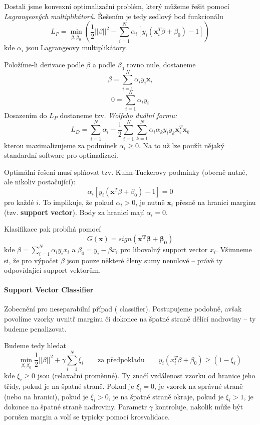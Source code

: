 \documentclass[11pt]{report} %
\renewcommand{\vec}[1]{\mathbf{#1}}
\numberwithin{equation}{section}
\begin{document}
Dostali jsme konvexní optimalizační problém, který můžeme řešit pomocí \textit{Lagrangeových multiplikátorů}. Řešením je tedy sedlový bod funkcionálu
$$L_P = \min_{\beta,\beta_0}\left(\frac{1}{2}||\beta||^2 - \sum_{i=1}^{N} \alpha_i [y_i(\vec{x}_i^T\beta + \beta_0)-1]\right)$$ 
kde $\alpha_i$ jsou Lagrangeovy multiplikátory.

Položíme-li derivace podle $\beta$ a podle $\beta_0$ rovno nule, dostaneme
$$\beta = \sum_{i=1}^{N} \alpha_i y_i \vec{x}_i$$
$$0 = \sum_{i=1}^{N} \alpha_i y_i$$
Dosazením do $L_P$ dostaneme tzv. \textit{Wolfeho duální formu:}
$$L_D = \sum_{i=1}^{N}\alpha_i - \frac{1}{2}\sum_{i=1}^{N}\sum_{k=1}^{N}\alpha_i \alpha_k y_i y_k \vec{x}_i^T \vec{x}_k$$
kterou maximalizujeme za podmínek $\alpha_i \geq0$. Na to už lze použít nějaký standardní software pro optimalizaci.

Optimální řešení musí splňovat tzv. Kuhn-Tuckerovy podmínky (obecně nutné, ale nikoliv postačující):
$$\alpha_i [y_i(\vec{x}^T\beta + \beta_0)-1] = 0$$
pro každé $i$. To implikuje, že pokud $\alpha_i > 0$, je nutně $\vec{x}_i$ přesně na hranici marginu (tzv. \textbf{support vector}). Body za hranicí mají $\alpha_i = 0$.

Klasifikace pak probíhá pomocí 
$$G(\vec{x}) = sign(\vec{x^T \beta + \beta_0})$$
kde $\beta = \sum_{i=1}^{N}\alpha_i y_i x_i$ a $\beta_0 = y_i - \beta x_i$ pro libovolný support vector $x_i$. Všimneme si, že pro výpočet $\beta$ jsou pouze některé členy sumy nenulové -- právě ty odpovídající support vektorům.

\paragraph{Support Vector Classifier}
Zobecnění pro neseparabilní případ ( classifier). Postupujeme podobně, avšak povolíme vzorky uvnitř marginu či dokonce na špatné straně dělící nadroviny -- ty budeme penalizovat. 

Budeme tedy hledat
$$\min\limits_{\beta,\beta_0} \frac{1}{2}||\beta||^2 + \gamma \sum_{i=1}^{N}\xi_i
\qquad\text{za předpokladu}\qquad
y_i(x_i^T\beta + \beta_0) \geq (1 - \xi_i)$$
kde $\xi_i \geq 0$ jsou \textbf{} (relaxační proměnné). Ty značí vzdálenost vzorku od hranice jeho třídy, pokud je na špatné straně. Pokud je $\xi_i = 0$, je vzorek na správné straně (nebo na hranici), pokud je $\xi_i > 0$, je na špatné straně okraje, pokud je $\xi_i > 1$, je dokonce na špatné straně nadroviny. Parametr $\gamma$ kontroluje, nakolik může být porušen margin a volí se typicky pomocí krosvalidace.
\end{document}

